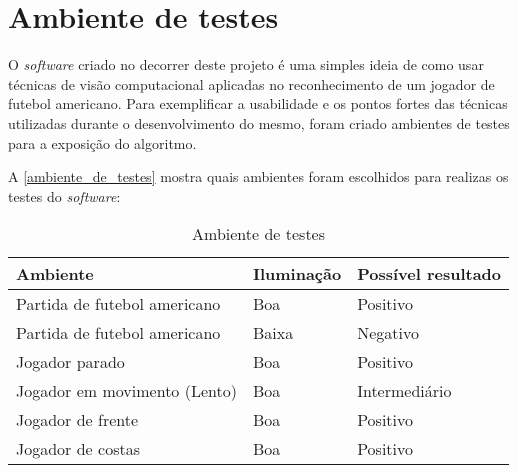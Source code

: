 \section{\textbf{Ambiente de testes}}
\label{ambientes-de-teste}

O \textit{software} criado no decorrer deste projeto é uma simples ideia de como usar técnicas de visão computacional aplicadas no reconhecimento de um jogador de futebol americano. Para exemplificar a usabilidade e os pontos fortes das técnicas utilizadas durante o desenvolvimento do mesmo, foram criado ambientes de testes para a exposição do algoritmo.
\clearpage

A \autoref{ambiente_de_testes} mostra quais ambientes foram escolhidos para realizas os testes do \textit{software}:

\begin{table}[!h]
\centering
\caption{Ambiente de testes}
\label{ambiente_de_testes}
\begin{tabular}{l|l|l} 
\hline
\hline
\multicolumn{1}{l|}{Ambiente} & Iluminação & \multicolumn{1}{l}{Possível resultado}  \\ 
\hline
Partida de futebol americano   & Boa        & Positivo                                 \\
Partida de futebol americano   & Baixa      & Negativo                                 \\
Jogador parado                 & Boa        & Positivo                                 \\
Jogador em movimento (Lento)   & Boa        & Intermediário                            \\
Jogador de frente              & Boa        & Positivo                                 \\
Jogador de costas              & Boa        & Positivo \\
\hline
\hline 
\end{tabular}
\end{table}